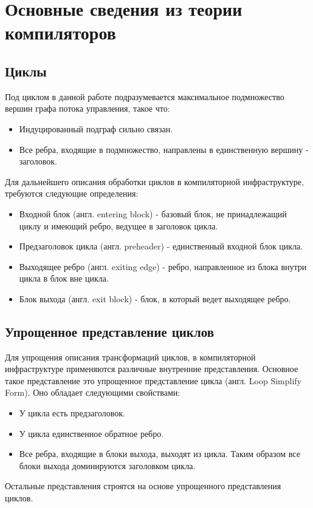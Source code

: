 \chapter{Основные сведения из теории компиляторов}
\label{sec:Chapter1} 

\section{Циклы}

Под циклом\cite{Muchnick_Loops} в данной работе подразумевается максимальное подмножество вершин графа потока управления, такое что:
\begin{itemize}
    \item Индуцированный подграф сильно связан.
    \item Все ребра, входящие в подмножество, направлены в единственную вершину - заголовок.
\end{itemize}

Для дальнейшего описания обработки циклов в компиляторной инфраструктуре, требуются следующие определения:
\begin{itemize}
    \item Входной блок (англ. entering block) - базовый блок, не принадлежащий циклу и имеющий ребро, ведущее в заголовок цикла.
    \item Предзаголовок цикла (англ. preheader) - единственный входной блок цикла.
    \item Выходящее ребро (англ. exiting edge) - ребро, направленное из блока внутри цикла в блок вне цикла.
    \item Блок выхода (англ. exit block) - блок, в который ведет выходящее ребро.
\end{itemize}

\section{Упрощенное представление циклов}

Для упрощения описания трансформаций циклов, в компиляторной инфраструктуре применяются различные внутренние представления.
Основное такое представление это упрощенное представление цикла (англ. Loop Simplify Form).
Оно обладает следующими свойствами:
\begin{itemize}
    \item У цикла есть предзаголовок.
    \item У цикла единственное обратное ребро.
    \item Все ребра, входящие в блоки выхода, выходят из цикла. Таким образом все блоки выхода доминируются заголовком цикла.
\end{itemize}
Остальные представления строятся на основе упрощенного представления циклов.


